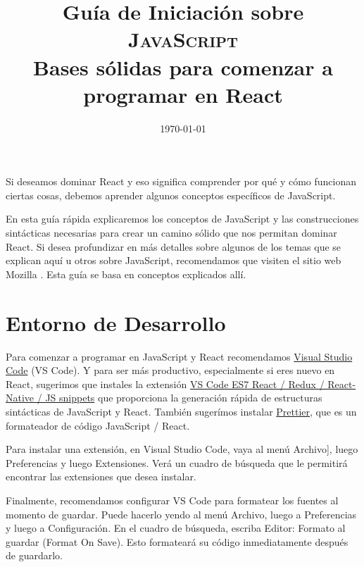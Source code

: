 \documentclass[a4paper, oneside, titlepage, 12pt]{paper}
\title{%
	Guía de Iniciación sobre \textsc{JavaScript}\\
	\large Bases sólidas para comenzar a programar en React}
\date{\today}
\begin{document}
\maketitle
\tableofcontents
		

\newpage
Si deseamos dominar React y eso significa comprender por qué y cómo funcionan ciertas cosas, debemos aprender algunos conceptos específicos de JavaScript.
\newline

En esta guía rápida explicaremos los conceptos de JavaScript y las construcciones sintácticas necesarias para crear un camino sólido que nos permitan dominar React. Si desea profundizar en más detalles sobre algunos de los temas que se explican aquí u otros sobre JavaScript, recomendamos que visiten el sitio web Mozilla \cite{mozilla}. Esta guía se basa en conceptos explicados allí.

\section{Entorno de Desarrollo}

Para comenzar a programar en JavaScript y React recomendamos \href{https://code.visualstudio.com/} {Visual Studio Code} (VS Code). Y para ser más productivo, especialmente si eres nuevo en React, sugerimos que instales la extensión \href {https://marketplace.visualstudio.com/items?itemName=dsznajder.es7-react-js-snippets} {VS Code ES7 React / Redux / React-Native / JS snippets} que proporciona la generación rápida de estructuras sintácticas de JavaScript y React. También sugerímos instalar \href {https://marketplace.visualstudio.com/items?itemName=esbenp.prettier-vscode} {Prettier}, que es un formateador de código JavaScript / React.
\newline

Para instalar una extensión, en Visual Studio Code, vaya al menú \textsf{Archivo]}, luego \textsf{Preferencias} y luego \textsf{Extensiones}. Verá un cuadro de búsqueda que le permitirá encontrar las extensiones que desea instalar.
\newline

Finalmente, recomendamos configurar VS Code para formatear los fuentes al momento de guardar. Puede hacerlo yendo al menú \textsf{Archivo}, luego a \textsf{Preferencias} y luego a \textsf{Configuración}. En el cuadro de búsqueda, escriba Editor: Formato al guardar (Format On Save). Esto formateará su código inmediatamente después de guardarlo.
\end{document}
